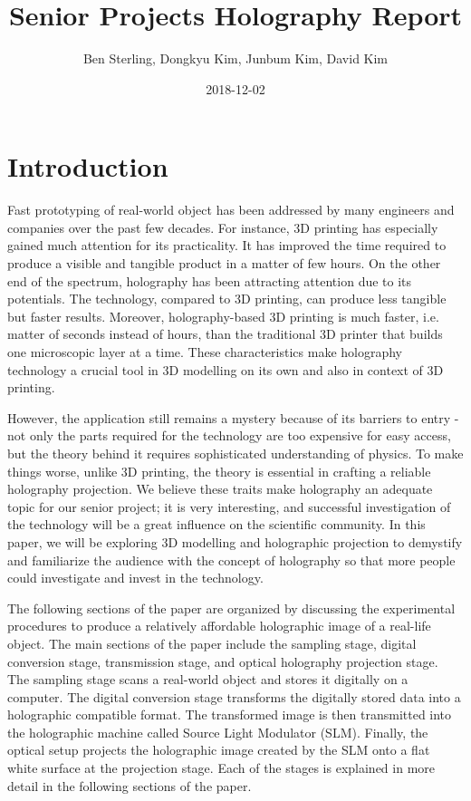 \documentclass[12pt]{article}
\title{Senior Projects Holography Report}
\date{2018-12-02}
\author{Ben Sterling, Dongkyu Kim, Junbum Kim, David Kim}
\begin{document}
\maketitle
\clearpage

\section{Introduction}
\qquad
Fast prototyping of real-world object has been addressed by many engineers and companies over the past few decades. For instance, 3D printing has especially gained much attention for its practicality. It has improved the time required to produce a visible and tangible product in a matter of few hours. On the other end of the spectrum, holography has been attracting attention due to its potentials. The technology, compared to 3D printing, can produce less tangible but faster results. Moreover, holography-based 3D printing is much faster, i.e. matter of seconds instead of hours, than the traditional 3D printer that builds one microscopic layer at a time. These characteristics make holography technology a crucial tool in 3D modelling on its own and also in context of 3D printing.

However, the application still remains a mystery because of its barriers to entry - not only the parts required for the technology are too expensive for easy access, but the theory behind it requires sophisticated understanding of physics. To make things worse, unlike 3D printing, the theory is essential in crafting a reliable holography projection. We believe these traits make holography an adequate topic for our senior project; it is very interesting, and successful investigation of the technology will be a great influence on the scientific community. In this paper, we will be exploring 3D modelling and holographic projection to demystify and familiarize the audience with the concept of holography so that more people could investigate and invest in the technology.
\par
The following sections of the paper are organized by discussing the experimental procedures to produce a relatively affordable holographic image of a real-life object. The main sections of the paper include the sampling stage, digital conversion stage, transmission stage, and optical holography projection stage. The sampling stage scans a real-world object and stores it digitally on a computer. The digital conversion stage transforms the digitally stored data into a holographic compatible format. The transformed image is then transmitted into the holographic machine called Source Light Modulator (SLM). Finally, the optical setup projects the holographic image created by the SLM onto a flat white surface at the projection stage. Each of the stages is explained in more detail in the following sections of the paper.
\end{document}
